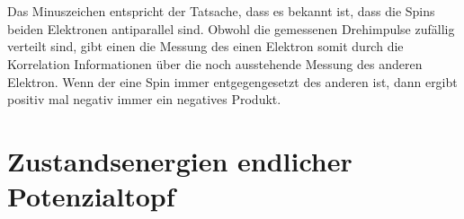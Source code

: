 \documentclass[ex,minted]{exercise_3.1}
\begin{document}
\subsection{}
\begin{align*}
\end{align*}

\subsection{}
Das Minuszeichen entspricht der Tatsache, dass es bekannt ist, dass die Spins beiden Elektronen
antiparallel sind. Obwohl die gemessenen Drehimpulse zufällig verteilt sind, gibt einen 
die Messung des einen Elektron somit durch die Korrelation 
Informationen über die noch ausstehende Messung des anderen Elektron.
Wenn der eine Spin immer entgegengesetzt des anderen ist, dann ergibt positiv mal negativ immer 
ein negatives Produkt.
 
\section{Zustandsenergien endlicher Potenzialtopf}
\end{document}
